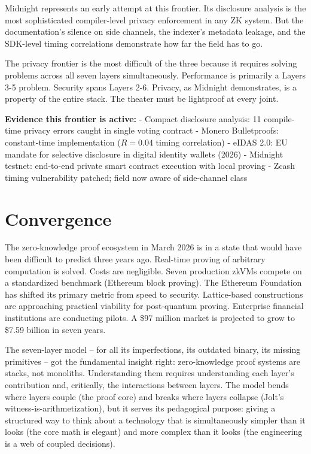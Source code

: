 \documentclass[
  11pt,
  openany]{report}
\renewcommand{\textbf}[1]{{\bfseries\color{MidnightBold}#1}}
\begin{document}
Midnight represents an early attempt at this frontier. Its disclosure analysis
is the most sophisticated compiler-level privacy enforcement in any ZK system.
But the documentation's silence on side channels, the indexer's metadata
leakage, and the SDK-level timing correlations demonstrate how far the field has
to go.

The privacy frontier is the most difficult of the three because it requires
solving problems across all seven layers simultaneously. Performance is
primarily a Layers 3-5 problem. Security spans Layers 2-6. Privacy, as Midnight
demonstrates, is a property of the entire stack. The theater must be lightproof
at every joint.

\textbf{Evidence this frontier is active:} - Compact disclosure analysis: 11
compile-time privacy errors caught in single voting contract - Monero
Bulletproofs: constant-time implementation (\(R = 0.04\) timing correlation) -
eIDAS 2.0: EU mandate for selective disclosure in digital identity wallets
(2026) - Midnight testnet: end-to-end private smart contract execution with
local proving - Zcash timing vulnerability patched; field now aware of
side-channel class

\section{Convergence}\label{convergence}

The zero-knowledge proof ecosystem in March 2026 is in a state that would have
been difficult to predict three years ago. Real-time proving of arbitrary
computation is solved. Costs are negligible. Seven production zkVMs compete on a
standardized benchmark (Ethereum block proving). The Ethereum Foundation has
shifted its primary metric from speed to security. Lattice-based constructions
are approaching practical viability for post-quantum proving. Enterprise
financial institutions are conducting pilots. A \$97 million market is projected
to grow to \$7.59 billion in seven years.

The seven-layer model -- for all its imperfections, its outdated binary, its
missing primitives -- got the fundamental insight right: zero-knowledge proof
systems are stacks, not monoliths. Understanding them requires understanding
each layer's contribution and, critically, the interactions between layers. The
model bends where layers couple (the proof core) and breaks where layers
collapse (Jolt's witness-is-arithmetization), but it serves its pedagogical
purpose: giving a structured way to think about a technology that is
simultaneously simpler than it looks (the core math is elegant) and more complex
than it looks (the engineering is a web of coupled decisions).
\end{document}

